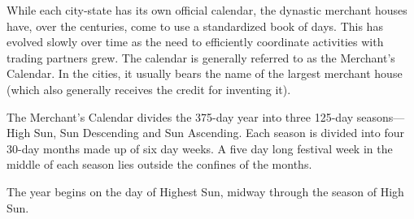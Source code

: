 While each city-state has its own official calendar, the dynastic merchant houses have, over the centuries, come to use a standardized book of days. This has evolved slowly over time as the need to efficiently coordinate activities with trading partners grew. The calendar is generally referred to as the Merchant's Calendar. In the cities, it usually bears the name of the largest merchant house (which also generally receives the credit for inventing it).

The Merchant's Calendar divides the 375-day year into three 125-day seasons---High Sun, Sun Descending and Sun Ascending. Each season is divided into four 30-day months made up of six day weeks. A five day long festival week in the middle of each season lies outside the confines of the months.

The year begins on the day of Highest Sun, midway through the season of High Sun.
